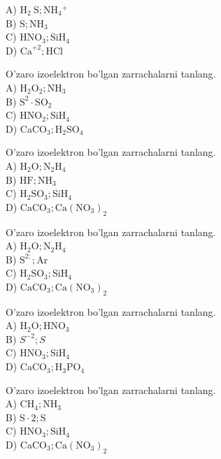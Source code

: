 A) $\mathrm{H}_{2} \mathrm{~S} ; \mathrm{NH}_{4}{ }^{+}$\\
B) $\mathrm{S} ; \mathrm{NH}_{3}$\\
C) $\mathrm{HNO}_{3} ; \mathrm{SiH}_{4}$\\
D) $\mathrm{Ca}^{+2} ; \mathrm{HCl}$
  \item O'zaro izoelektron bo'lgan zarrachalarni tanlang.\\
A) $\mathrm{H}_{2} \mathrm{O}_{2} ; \mathrm{NH}_{3}$\\
B) $\mathrm{S}^{2} \cdot \mathrm{SO}_{2}$\\
C) $\mathrm{HNO}_{2} ; \mathrm{SiH}_{4}$\\
D) $\mathrm{CaCO}_{3} ; \mathrm{H}_{2} \mathrm{SO}_{4}$
  \item O'zaro izoelektron bo'lgan zarrachalarni tanlang.\\
A) $\mathrm{H}_{2} \mathrm{O} ; \mathrm{N}_{2} \mathrm{H}_{4}$\\
B) $\mathrm{HF} ; \mathrm{NH}_{3}$\\
C) $\mathrm{H}_{2} \mathrm{SO}_{3} ; \mathrm{SiH}_{4}$\\
D) $\mathrm{CaCO}_{3} ; \mathrm{Ca}\left(\mathrm{NO}_{3}\right)_{2}$
  \item O'zaro izoelektron bo'lgan zarrachalarni tanlang.\\
A) $\mathrm{H}_{2} \mathrm{O} ; \mathrm{N}_{2} \mathrm{H}_{4}$\\
B) $\mathrm{S}^{2 ;} ; \mathrm{Ar}$\\
C) $\mathrm{H}_{2} \mathrm{SO}_{3} ; \mathrm{SiH}_{4}$\\
D) $\mathrm{CaCO}_{3} ; \mathrm{Ca}\left(\mathrm{NO}_{3}\right)_{2}$
  \item O'zaro izoelektron bo'lgan zarrachalarni tanlang.\\
A) $\mathrm{H}_{2} \mathrm{O} ; \mathrm{HNO}_{3}$\\
B) $S^{-2} ; S$\\
C) $\mathrm{HNO}_{3} ; \mathrm{SiH}_{4}$\\
D) $\mathrm{CaCO}_{3} ; \mathrm{H}_{3} \mathrm{PO}_{4}$
  \item O'zaro izoelektron bo'lgan zarrachalarni tanlang.\\
A) $\mathrm{CH}_{4} ; \mathrm{NH}_{3}$\\
B) $\mathrm{S} \cdot 2 ; \mathrm{S}$\\
C) $\mathrm{HNO}_{3} ; \mathrm{SiH}_{4}$\\
D) $\mathrm{CaCO}_{3} ; \mathrm{Ca}\left(\mathrm{NO}_{3}\right)_{2}$
